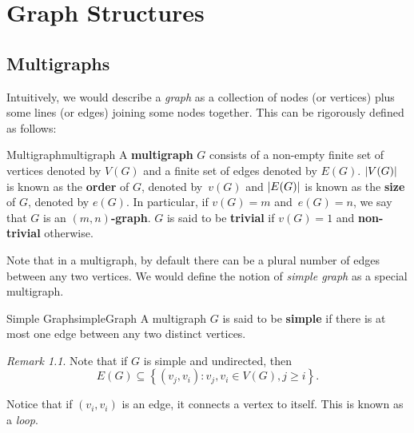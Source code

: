 \documentclass[math]{amznotes}
\theoremstyle{remark}
\newtheorem*{remark}{Remark}
\newcommand{\0}{\mathbf{0}}
\newcommand{\1}{\mathbf{1}}
\begin{document}
\tableofcontents

\chapter{Graph Structures}
\section{Multigraphs}
Intuitively, we would describe a \textit{graph} as a collection of nodes (or vertices) plus some lines (or edges) joining some nodes together. This can be rigorously defined as follows:
\begin{dfnbox}{Multigraph}{multigraph}
    A {\color{red} \textbf{multigraph}} $G$ consists of a non-empty finite set of vertices denoted by $V(G)$ and a finite set of edges denoted by $E(G)$. ${\left\lvert {V(G)} \right\rvert}$ is known as the {\color{red} \textbf{order}} of $G$, denoted by~$v(G)$ and ${\left\lvert {E(G)} \right\rvert}$ is known as the {\color{red} \textbf{size}} of $G$, denoted by $e(G)$. In particular, if $v(G) = m$ and~$e(G) = n$, we say that $G$ is an {\color{red} \textbf{$(m, n)$-graph}}. $G$ is said to be {\color{red} \textbf{trivial}} if $v(G) = 1$ and {\color{red} \textbf{non-trivial}} otherwise.
\end{dfnbox}
Note that in a multigraph, by default there can be a plural number of edges between any two vertices. We would define the notion of \textit{simple graph} as a special multigraph.
\begin{dfnbox}{Simple Graph}{simpleGraph}
    A multigraph $G$ is said to be {\color{red} \textbf{simple}} if there is at most one edge between any two distinct vertices.
\end{dfnbox}
\begin{notebox}
    \begin{remark}
        Note that if $G$ is simple and undirected, then
        \begin{displaymath}
            E(G) \subseteq \left\{(v_j, v_i) \colon v_j, v_i \in V(G), j \geq i\right\}.
        \end{displaymath}
    \end{remark}
\end{notebox}
Notice that if $(v_i, v_i)$ is an edge, it connects a vertex to itself. This is known as a \textit{loop}.
\end{document}
